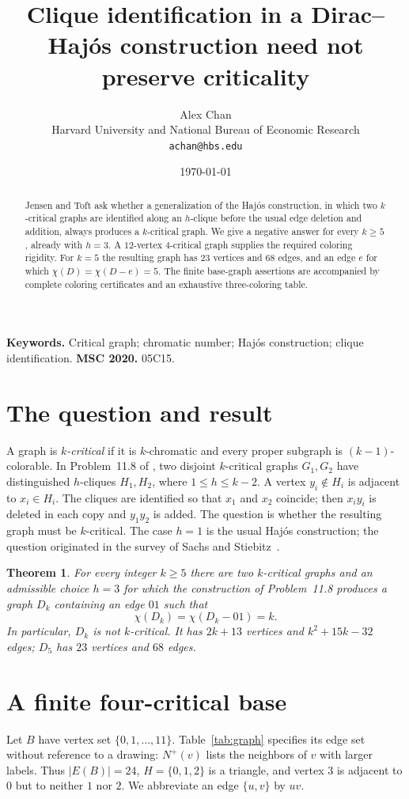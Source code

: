 \documentclass[11pt]{article}
\title{Clique identification in a Dirac--Haj\'os construction need not preserve criticality}
\author{Alex Chan\\[2pt]
  \small Harvard University and National Bureau of Economic Research\\[-1pt]
  \small \texttt{achan@hbs.edu}}
\date{\today}
\newtheorem{theorem}{Theorem}
\newcommand{\chiG}{\chi}
\begin{document}
\maketitle
\begin{abstract}
Jensen and Toft ask whether a generalization of the Haj\'os construction, in which two $k$-critical graphs are identified along an $h$-clique before the usual edge deletion and addition, always produces a $k$-critical graph. We give a negative answer for every $k\geq5$, already with $h=3$. A $12$-vertex $4$-critical graph supplies the required coloring rigidity. For $k=5$ the resulting graph has $23$ vertices and $68$ edges, and an edge $e$ for which $\chi(D)=\chi(D-e)=5$. The finite base-graph assertions are accompanied by complete coloring certificates and an exhaustive three-coloring table.
\end{abstract}
\noindent\textbf{Keywords.} Critical graph; chromatic number; Haj\'os construction; clique identification.\qquad
\textbf{MSC 2020.} 05C15.

\section{The question and result}
A graph is \emph{$k$-critical} if it is $k$-chromatic and every proper subgraph is $(k-1)$-colorable. In Problem~11.8 of \cite{JensenToft}, two disjoint $k$-critical graphs $G_1,G_2$ have distinguished $h$-cliques $H_1,H_2$, where $1\leq h\leq k-2$. A vertex $y_i\notin H_i$ is adjacent to $x_i\in H_i$. The cliques are identified so that $x_1$ and $x_2$ coincide; then $x_iy_i$ is deleted in each copy and $y_1y_2$ is added. The question is whether the resulting graph must be $k$-critical. The case $h=1$ is the usual Haj\'os construction; the question originated in the survey of Sachs and Stiebitz~\cite{SachsStiebitz}.

\begin{theorem}\label{thm:main}
For every integer $k\geq5$ there are two $k$-critical graphs and an admissible choice $h=3$ for which the construction of Problem~11.8 produces a graph $D_k$ containing an edge $01$ such that
\[
\chiG(D_k)=\chiG(D_k-01)=k.
\]
In particular, $D_k$ is not $k$-critical. It has $2k+13$ vertices and $k^2+15k-32$ edges; $D_5$ has $23$ vertices and $68$ edges.
\end{theorem}

\section{A finite four-critical base}
Let $B$ have vertex set $\{0,1,\ldots,11\}$. Table~\ref{tab:graph} specifies its edge set without reference to a drawing: $N^+(v)$ lists the neighbors of $v$ with larger labels. Thus $|E(B)|=24$, $H=\{0,1,2\}$ is a triangle, and vertex $3$ is adjacent to $0$ but to neither $1$ nor $2$. We abbreviate an edge $\{u,v\}$ by $uv$.
\end{document}
